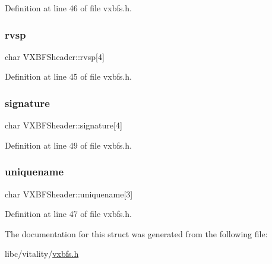 Definition at line 46 of file vxbfs.\+h.

\mbox{\label{a00336_aad660a962d04482ff03bce38000c1a37_aad660a962d04482ff03bce38000c1a37}} 
\subsubsection{\texorpdfstring{rvsp}{rvsp}}
{\footnotesize\ttfamily char V\+X\+B\+F\+Sheader\+::rvsp\mbox{[}4\mbox{]}}



Definition at line 45 of file vxbfs.\+h.

\mbox{\label{a00336_a4c82fb69a08f04d22d832e030cc71577_a4c82fb69a08f04d22d832e030cc71577}} 
\subsubsection{\texorpdfstring{signature}{signature}}
{\footnotesize\ttfamily char V\+X\+B\+F\+Sheader\+::signature\mbox{[}4\mbox{]}}



Definition at line 49 of file vxbfs.\+h.

\mbox{\label{a00336_af0310ee852d6ec20fe68052fff0d1378_af0310ee852d6ec20fe68052fff0d1378}} 
\subsubsection{\texorpdfstring{uniquename}{uniquename}}
{\footnotesize\ttfamily char V\+X\+B\+F\+Sheader\+::uniquename\mbox{[}3\mbox{]}}



Definition at line 47 of file vxbfs.\+h.



The documentation for this struct was generated from the following file\+:\begin{DoxyCompactItemize}
\item 
libc/vitality/\hyperlink{a00206}{vxbfs.\+h}\end{DoxyCompactItemize}
